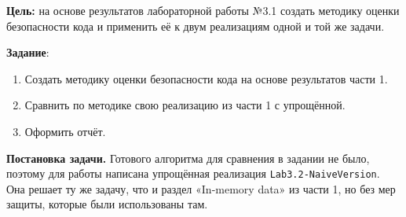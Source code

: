 \textbf{Цель:} на основе результатов лабораторной работы №3.1 создать
методику оценки безопасности кода и применить её к двум реализациям
одной и той же задачи.

\vspace{1em}

\textbf{Задание}:
\begin{enumerate}
  \item Создать методику оценки безопасности кода на основе результатов
  части 1.
  \item Сравнить по методике свою реализацию из части 1 с упрощённой.
  \item Оформить отчёт.
\end{enumerate}

\textbf{Постановка задачи.} Готового алгоритма для сравнения в задании
не было, поэтому для работы написана упрощённая реализация
\texttt{Lab3.2-NaiveVersion}. Она решает ту же задачу, что и раздел
«In-memory data» из части 1, но без мер защиты, которые были
использованы там.
